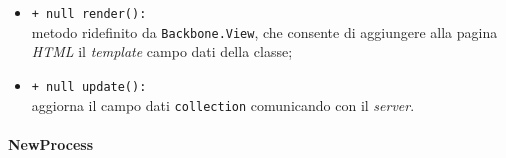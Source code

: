 \begin{flushleft}
\begin{itemize}
\begin{sloppypar}
\begin{itemize}
\item \texttt{+ null render():}\\ metodo ridefinito da \texttt{Backbone.View}, che consente di aggiungere alla pagina \textit{HTML} il \textit{template} campo dati della classe;
\item \texttt{+ null update():}\\ aggiorna il campo dati \texttt{collection} comunicando con il \textit{server}.
\end{itemize}
\end{sloppypar}
\end{itemize}
\end{flushleft}

\paragraph{NewProcess}
\label{newProcess}
